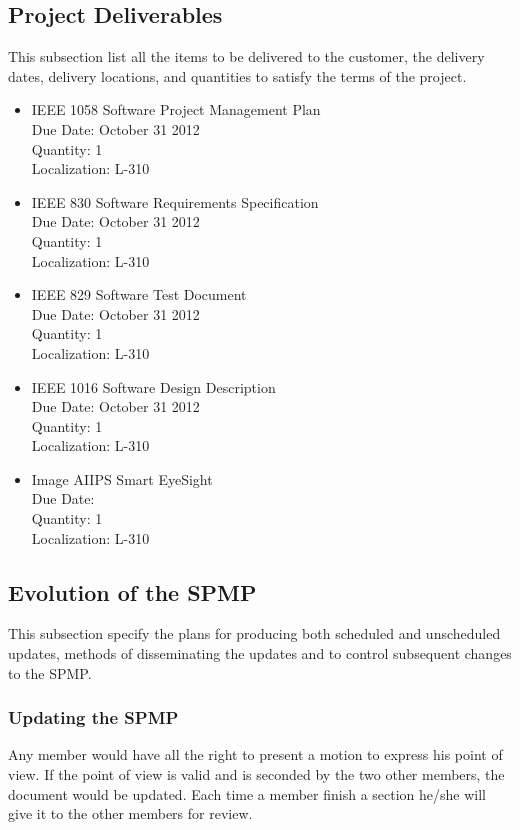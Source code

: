 \documentclass[12pt]{article}
\begin{document}
\subsection{Project Deliverables}
This subsection list all the items to be delivered to the customer, the delivery dates, delivery locations, and quantities to satisfy the terms of the project.
\begin{itemize}
  \item IEEE 1058 Software Project Management Plan\\
            Due Date: October 31 2012 \\
            Quantity: 1\\
            Localization: L-310
  \item IEEE 830 Software Requirements Specification\\
            Due Date: October 31 2012\\
            Quantity: 1\\
            Localization: L-310
  \item IEEE 829 Software Test Document \\
            Due Date: October 31 2012\\
            Quantity: 1\\
            Localization: L-310

  \item IEEE 1016 Software Design Description\\
            Due Date: October 31 2012\\
            Quantity: 1\\
            Localization: L-310

  \item Image AIIPS Smart EyeSight\\
            Due Date:\\
            Quantity: 1\\
            Localization: L-310
\end{itemize}

\subsection{Evolution of the SPMP}
This subsection specify the plans for producing both scheduled and unscheduled updates, methods of disseminating the updates and to control subsequent changes to the SPMP.
\subsubsection{Updating the SPMP}
Any member would have all the right to present a motion to express his point of view.  If the point of view is valid and is seconded by the two other members, the document would be updated. Each time a member finish a section he/she will give it to the other members for review.
\end{document}
